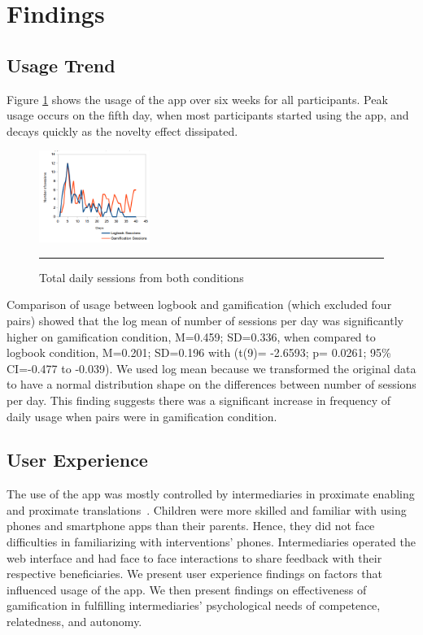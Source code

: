\documentclass{sig-alternate}
\begin{document}
\section{Findings}
\subsection{Usage Trend} 
Figure \ref{figure:usagedailysessions} shows the usage of the app over six weeks for all participants. Peak usage occurs on the fifth day, when most participants started using the app, and decays quickly as the novelty effect dissipated. 
\begin{figure}[htbp]
  \centering
    \includegraphics[width=0.32\textwidth]{scatter_daily_sessions.png}
    \rule{26em}{0.5pt}
  \caption{Total daily sessions from both conditions}
  \label{figure:usagedailysessions}
\end{figure} 
Comparison of usage between logbook and gamification (which excluded four pairs) showed that the log mean of number of sessions per day was significantly higher on gamification condition, M=0.459; SD=0.336, when compared to logbook condition, M=0.201; SD=0.196 with (t(9)= -2.6593; p= 0.0261; 95\% CI=-0.477 to -0.039). We used log mean because we transformed the original data to have a normal distribution shape on the differences between number of sessions per day. This finding suggests there was a significant increase in frequency of daily usage when pairs were in gamification condition.

\subsection{User Experience}
The use of the app was mostly controlled by intermediaries in proximate enabling and proximate translations~\cite{sambasivan2010}. Children were more skilled and familiar with using phones and smartphone apps than their parents. Hence, they did not face difficulties in familiarizing with interventions' phones. Intermediaries operated the web interface and had face to face interactions to share feedback with their respective beneficiaries. We present user experience findings on factors that influenced usage of the app. We then present findings on effectiveness of gamification in fulfilling intermediaries' psychological needs of competence, relatedness, and autonomy.
\end{document}
